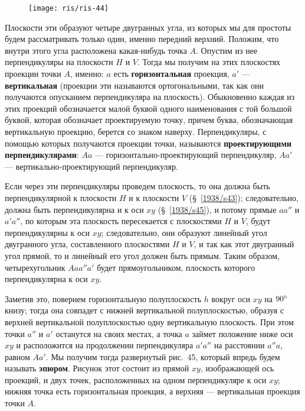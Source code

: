 \documentclass[twoside]{book}
\begin{document}
\begin{figure}[h!]
\centering
\texttt{[image: ris/ris-44]}
\caption{}
\end{figure}

Плоскости эти образуют четыре двугранных угла, из которых мы для простоты будем рассматривать только один, именно передний верхний.
Положим, что внутри этого угла расположена какая-нибудь точка $A$.
Опустим из нее перпендикуляры на плоскости $H$ и $V$.
Тогда мы получим на этих плоскостях проекции точки $A$, именно: $a$ есть \textbf{горизонтальная} проекция, $a'$ --- \textbf{вертикальная} (проекции эти называются ортогональными, так как они получаются опусканием перпендикуляра на плоскость).
Обыкновенно каждая из этих проекций обозначается малой буквой одного наименования с той большой буквой, которая обозначает проектируемую точку, причем буква, обозначающая вертикальную проекцию, берется со знаком наверху. %
Перпендикуляры, с помощью которых получаются проекции точки, называются \textbf{проектирующими перпендикулярами}: $Aa$ --- горизонтально-проектирующий перпендикуляр, $Aa'$ --- вертикально-проектирующий перпендикуляр.

Если через эти перпендикуляры проведем плоскость, то она должна быть перпендикулярной к плоскости $H$ и к плоскости $V$ (§~\ref{1938/s43});
следовательно, должна быть перпендикулярна и к оси $xy$ (§~\ref{1938/s45}), и потому прямые $aa''$ и $a'a''$, по которым эта плоскость пересекается с плоскостями $H$ и $V$, будут перпендикулярны к оси $xy$;
следовательно, они образуют линейный угол двугранного угла, составленного плоскостями $H$ и $V$, и так как этот двугранный угол прямой, то и линейный его угол должен быть прямым.
Таким образом, четырехугольник $Aaa''a'$ будет прямоугольником, плоскость которого перпендикулярна к оси $xy$.

Заметив это, повернем горизонтальную полуплоскость $h$ вокруг оси $xy$ на $90\degree$ книзу;
тогда она совпадет с нижней вертикальной полуплоскостью, образуя с верхней вертикальной полуплоскостью одну вертикальную плоскость.
При этом точки $a''$ и $a'$ останутся на своих местах, а точка $a$ займет положение ниже оси $xy$ и расположится на продолжении перпендикуляра $a'a''$ на расстоянии $a''a$, равном $Aa'$.
Мы получим тогда развернутый рис.~45, который впредь будем называть \textbf{эпюром}. %
Рисунок этот состоит из прямой $xy$, изображающей ось проекций, и двух точек, расположенных на одном перпендикуляре к оси $xy$;
нижняя точка есть горизонтальная проекция, а верхняя --- вертикальная проекция точки $A$.
\end{document}
